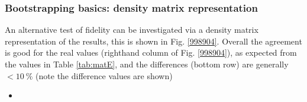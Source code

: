 \subsubsection{Bootstrapping basics: density matrix representation}

An alternative test of fidelity can be investigated via a density matrix representation of the results, this is shown in Fig. \ref{998904}. Overall the agreement is good for the real values (righthand column of Fig. \ref{998904}), as expected from the values in Table \ref{tab:matE}, and the differences (bottom row) are generally $<10~\%$ (note the difference values are shown)

\begin{itemize}
\item 
\end{itemize}